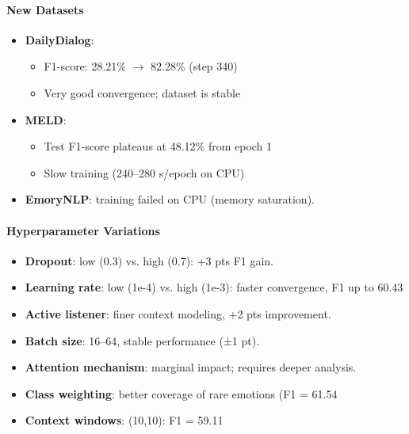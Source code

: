 \documentclass[a4paper,11pt]{article}
\begin{document}
\paragraph{New Datasets}
\begin{itemize}
  \item \textbf{DailyDialog}:
    \begin{itemize}
      \item F1-score: 28.21\% $\rightarrow$ 82.28\% (step 340)
      \item Very good convergence; dataset is stable
    \end{itemize}
  \item \textbf{MELD}:
    \begin{itemize}
      \item Test F1-score plateaus at 48.12\% from epoch 1
      \item Slow training (240–280 s/epoch on CPU)
    \end{itemize}
  \item \textbf{EmoryNLP}: training failed on CPU (memory saturation).
\end{itemize}

\paragraph{Hyperparameter Variations}
\begin{itemize}
  \item \textbf{Dropout}: low (0.3) vs. high (0.7): +3 pts F1 gain.
  \item \textbf{Learning rate}: low (1e-4) vs. high (1e-3): faster convergence, F1 up to 60.43 %
  \item \textbf{Active listener}: finer context modeling, +2 pts improvement.
  \item \textbf{Batch size}: 16–64, stable performance (±1 pt).
  \item \textbf{Attention mechanism}: marginal impact; requires deeper analysis.
  \item \textbf{Class weighting}: better coverage of rare emotions (F1 = 61.54 %
  \item \textbf{Context windows}: (10,10): F1 = 59.11 %
\end{itemize}
\end{document}
